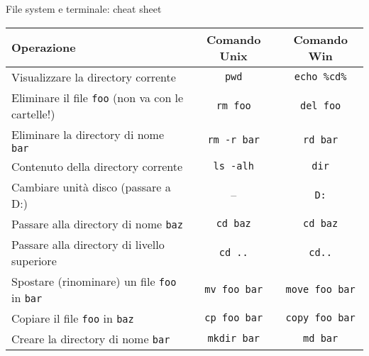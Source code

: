 \documentclass[presentation]{beamer}
\begin{document}
\begin{frame}[fragile]{File system e terminale: cheat sheet}
\label{slide:commands}
  \begin{center}
    \begin{tabular}{| l | c | c |}
      \hline
      \textbf{Operazione} & \textbf{Comando Unix} & \textbf{Comando Win} \\ \hline
      \scriptsize{}Visualizzare la directory corrente & \texttt{pwd} & \texttt{echo \%cd\%}  \\ \hline
      \scriptsize{}Eliminare il file \texttt{foo} (non va con le cartelle!) & \texttt{rm foo} & \texttt{del foo} \\ \hline
      \scriptsize{}Eliminare la directory di nome \texttt{bar} & \texttt{rm -r bar} & \texttt{rd bar} \\ \hline
      \scriptsize{}Contenuto della directory corrente & \texttt{ls -alh} & \texttt{dir} \\ \hline
      \scriptsize{}Cambiare unità disco (passare a D:) & -- & \texttt{D:} \\ \hline
      \scriptsize{}Passare alla directory di nome \texttt{baz} & \texttt{cd baz} & \texttt{cd baz} \\ \hline
      \scriptsize{}Passare alla directory di livello superiore & \texttt{cd ..} & \texttt{cd..} \\ \hline
      \scriptsize{}Spostare (rinominare) un file \texttt{foo} in \texttt{bar} & \texttt{mv foo bar} & \texttt{move foo bar} \\ \hline
      \scriptsize{}Copiare il file \texttt{foo} in \texttt{baz} & \texttt{cp foo bar} & \texttt{copy foo bar} \\ \hline
      \scriptsize{}Creare la directory di nome \texttt{bar} & \texttt{mkdir bar} & \texttt{md bar} \\ \hline
    \end{tabular}
  \end{center}
\end{frame}
\end{document}
